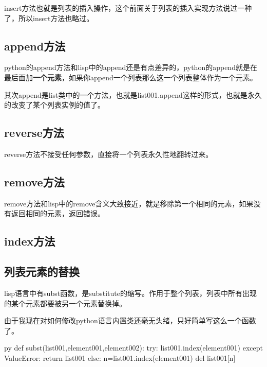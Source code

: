 \documentclass[12pt,oneside]{book}
\begin{document}
\begin{common-format}
insert方法也就是列表的插入操作，这个前面关于列表的插入实现方法说过一种了，所以insert方法也略过。

\subsection{append方法}
python的append方法和lisp中的append还是有点差异的，python的append就是在最后面加\textbf{一个元素}，如果你append一个列表那么这一个列表整体作为一个元素。

其次append是list类中的一个方法，也就是list001.append这样的形式，也就是永久的改变了某个列表实例的值了。

\subsection{reverse方法}
reverse方法不接受任何参数，直接将一个列表永久性地翻转过来。

\subsection{remove方法}
remove方法和lisp中的remove含义大致接近，就是移除第一个相同的元素，如果没有返回相同的元素，返回错误。

\subsection{index方法}


\subsection{列表元素的替换}
lisp语言中有subst函数，是substitute的缩写。作用于整个列表，列表中所有出现的某个元素都要被另一个元素替换掉。

由于我现在对如何修改python语言内置类还毫无头绪，只好简单写这么一个函数了。
\begin{xverbatim}[129]{py}
def subst(list001,element001,element002):
    try:
        list001.index(element001)
    except ValueError:
        return list001
    else:
        n=list001.index(element001)
        del list001[n]
        list001[n:n]=[element002]
        return subst(list001,element001,element002)

print(subst([1,'a',3,[4,5]],[4,5],'b'))
print(subst([1,1,5,4,1,6],1,'replaced'))
\end{xverbatim}
这个subst函数接受三个参数，表示接受的列表，要替换的元素和替换成为的元素。这里使用的程序结构是try...except...else...语句。其中try来侦测是不是有错误，其中index方法是看那个要替换的元素存不存在，由于不存在这个函数将产生一个\textbf{ValueError}错误，所以用except来接著。既然没有要替换的元素了，那么返回原列表即可，程序中止。


\end{common-format}
\end{document}
